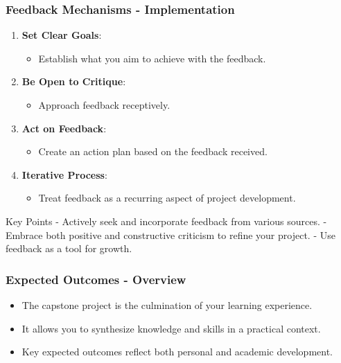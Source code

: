 \documentclass[aspectratio=169]{beamer}
\begin{document}
\begin{frame}[fragile]
    \frametitle{Feedback Mechanisms - Implementation}
    \begin{enumerate}
        \item \textbf{Set Clear Goals}:
            \begin{itemize}
                \item Establish what you aim to achieve with the feedback.
            \end{itemize}
        \item \textbf{Be Open to Critique}:
            \begin{itemize}
                \item Approach feedback receptively.
            \end{itemize}
        \item \textbf{Act on Feedback}:
            \begin{itemize}
                \item Create an action plan based on the feedback received.
            \end{itemize}
        \item \textbf{Iterative Process}:
            \begin{itemize}
                \item Treat feedback as a recurring aspect of project development.
            \end{itemize}
    \end{enumerate}

    \begin{block}{Key Points}
        - Actively seek and incorporate feedback from various sources.
        - Embrace both positive and constructive criticism to refine your project.
        - Use feedback as a tool for growth.
    \end{block}
\end{frame}

\begin{frame}[fragile]
    \frametitle{Expected Outcomes - Overview}
    \begin{itemize}
        \item The capstone project is the culmination of your learning experience.
        \item It allows you to synthesize knowledge and skills in a practical context.
        \item Key expected outcomes reflect both personal and academic development.
    \end{itemize}
\end{frame}
\end{document}
